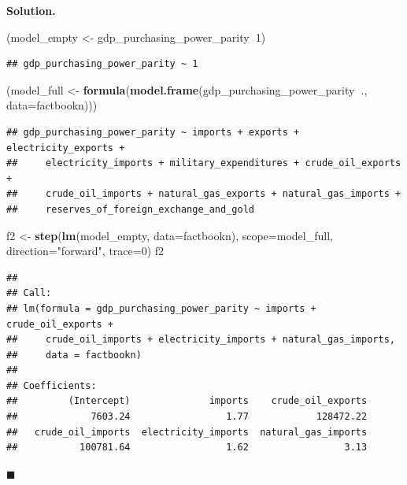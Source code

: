 \documentclass[10pt,b5paper,krantz1]{krantz}
\newenvironment{Shaded}{\begin{snugshade}}{\end{snugshade}}
\newcommand{\DataTypeTok}[1]{\textcolor[rgb]{0.27,0.27,0.27}{#1}}
\newcommand{\DecValTok}[1]{\textcolor[rgb]{0.06,0.06,0.06}{#1}}
\newcommand{\KeywordTok}[1]{\textcolor[rgb]{0.27,0.27,0.27}{\textbf{#1}}}
\newcommand{\NormalTok}[1]{#1}
\newcommand{\OperatorTok}[1]{\textcolor[rgb]{0.43,0.43,0.43}{\textbf{#1}}}
\newcommand{\StringTok}[1]{\textcolor[rgb]{0.5,0.5,0.5}{#1}}
\newenvironment{solution}{%
\bigskip\noindent\textbf{Solution. }%
\it\ignorespaces%
\ignorespaces%
}{\ignorespaces%
\hfill$\blacksquare$%
}
\begin{document}
\begin{solution}

\begin{Shaded}
\begin{Highlighting}[]
\NormalTok{(model_empty <-}\StringTok{ }\NormalTok{gdp_purchasing_power_parity}\OperatorTok{~}\DecValTok{1}\NormalTok{)}
\end{Highlighting}
\end{Shaded}

\begin{verbatim}
## gdp_purchasing_power_parity ~ 1
\end{verbatim}

\begin{Shaded}
\begin{Highlighting}[]
\NormalTok{(model_full <-}\StringTok{ }\KeywordTok{formula}\NormalTok{(}\KeywordTok{model.frame}\NormalTok{(gdp_purchasing_power_parity}\OperatorTok{~}\NormalTok{., }\DataTypeTok{data=}\NormalTok{factbookn)))}
\end{Highlighting}
\end{Shaded}

\begin{verbatim}
## gdp_purchasing_power_parity ~ imports + exports + electricity_exports + 
##     electricity_imports + military_expenditures + crude_oil_exports + 
##     crude_oil_imports + natural_gas_exports + natural_gas_imports + 
##     reserves_of_foreign_exchange_and_gold
\end{verbatim}

\begin{Shaded}
\begin{Highlighting}[]
\NormalTok{f2 <-}\StringTok{ }\KeywordTok{step}\NormalTok{(}\KeywordTok{lm}\NormalTok{(model_empty, }\DataTypeTok{data=}\NormalTok{factbookn),}
    \DataTypeTok{scope=}\NormalTok{model_full,}
    \DataTypeTok{direction=}\StringTok{"forward"}\NormalTok{, }\DataTypeTok{trace=}\DecValTok{0}\NormalTok{)}
\NormalTok{f2}
\end{Highlighting}
\end{Shaded}

\begin{verbatim}
## 
## Call:
## lm(formula = gdp_purchasing_power_parity ~ imports + crude_oil_exports + 
##     crude_oil_imports + electricity_imports + natural_gas_imports, 
##     data = factbookn)
## 
## Coefficients:
##         (Intercept)              imports    crude_oil_exports  
##             7603.24                 1.77            128472.22  
##   crude_oil_imports  electricity_imports  natural_gas_imports  
##           100781.64                 1.62                 3.13
\end{verbatim}


\end{solution}
\end{document}
